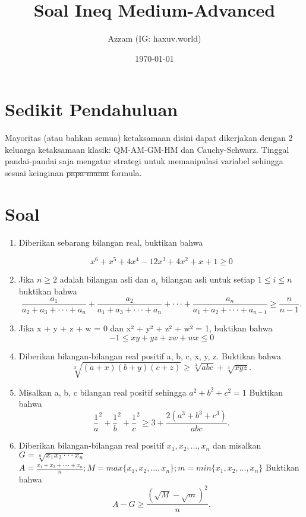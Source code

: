 \documentclass[11pt]{scrartcl}
\title{Soal Ineq Medium-Advanced}
\author{Azzam (IG: haxuv.world)}
\date{\today}
\begin{document}
\maketitle
\section{Sedikit Pendahuluan}
Mayoritas (atau bahkan semua) ketaksamaan disini dapat dikerjakan dengan 2 keluarga ketaksamaan klasik: QM-AM-GM-HM dan Cauchy-Schwarz. Tinggal pandai-pandai saja mengatur strategi untuk memanipulasi variabel sehingga sesuai keinginan \sout{papa-mama} formula.

\section{Soal}
\begin{enumerate}
\item Diberikan sebarang bilangan real, buktikan bahwa

\[x^{6}+x^{5}+4x^{4}-12x^{3}+4x^{2}+x+1\ge0\]

\item Jika \(n\ge2\) adalah bilangan asli dan \(a_{i}\) bilangan asli untuk setiap \(1\le i\le n\)
buktikan bahwa
\[\frac{a_{1}}{a_{2}+a_{3}+\cdot\cdot\cdot+a_{n}}+\frac{a_{2}}{a_{1}+a_{3}+\cdot\cdot\cdot+a_{n}}+\cdot\cdot\cdot+\frac{a_{n}}{a_{1}+a_{2}+\cdot\cdot\cdot+a_{n-1}}\ge\frac{n}{n-1}.\]

\item Jika x + y + z + w = 0 dan x² + y² + z² + w² = 1, buktikan bahwa
\[-1\le xy+yz+zw+wx\le0\]

\item Diberikan bilangan-bilangan real positif a, b, c, x, y, z. Buktikan bahwa
\[\sqrt[3]{(a+x)(b+y)(c+z)}\ge\sqrt[3]{abc}+\sqrt[3]{xyz}.\]

\item Misalkan a, b, c bilangan real positif sehingga \(a^{2}+b^{2}+c^{2}=1\) Buktikan bahwa
\[\frac{1}{a}^{2}+\frac{1}{b}^{2}+\frac{1}{c}^{2}\ge3+\frac{2(a^{3}+b^{3}+c^{3})}{abc}.\]
\item Diberikan bilangan-bilangan real positif \(x_{1},x_{2},...,x_{n}\) dan misalkan \(G=\sqrt[n]{x_{1}x_{2}\cdot\cdot\cdot x_{n}}\) \\
\(A=\frac{x_{1}+x_{2}+\cdot\cdot\cdot+x_{n}}{n};M=max\{x_{1},x_{2},...,x_{n}\};m=min\{x_{1},x_{2},...,x_{n}\}\) Buktikan \\
bahwa \\
\[A-G\ge\frac{(\sqrt{M}-\sqrt{m})^{2}}{n}.\]


\end{enumerate}
\end{document}
